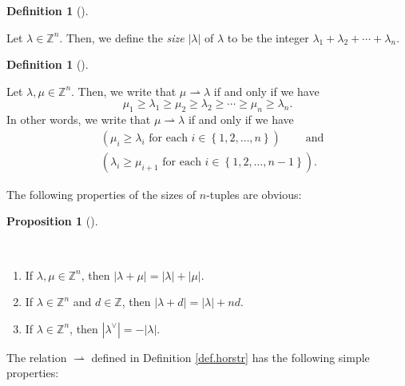 \documentclass[numbers=enddot,12pt,final,onecolumn,notitlepage]{scrartcl}%
\theoremstyle{definition}
\newtheorem{prop}[theo]{Proposition}
\newenvironment{proposition}[1][]
{\begin{prop}[#1]\begin{leftbar}}
{\end{leftbar}\end{prop}}
\newtheorem{defi}[theo]{Definition}
\newenvironment{definition}[1][]
{\begin{defi}[#1]\begin{leftbar}}
{\end{leftbar}\end{defi}}
\begin{document}
\begin{definition}
\label{def.size-snake}Let $\lambda\in\mathbb{Z}^{n}$. Then, we define the
\emph{size} $\left\vert \lambda\right\vert $ of $\lambda$ to be the integer
$\lambda_{1}+\lambda_{2}+\cdots+\lambda_{n}$.
\end{definition}

\begin{definition}
\label{def.horstr}Let $\lambda,\mu\in\mathbb{Z}^{n}$. Then, we write that
$\mu\rightharpoonup\lambda$ if and only if we have%
\begin{equation}
\mu_{1}\geq\lambda_{1}\geq\mu_{2}\geq\lambda_{2}\geq\cdots\geq\mu_{n}%
\geq\lambda_{n}. \label{eq.def.horstr.chain}%
\end{equation}
In other words, we write that $\mu\rightharpoonup\lambda$ if and only if we
have%
\begin{align*}
&  \left(  \mu_{i}\geq\lambda_{i}\text{ for each }i\in\left\{  1,2,\ldots
,n\right\}  \right)  \ \ \ \ \ \ \ \ \ \ \text{and}\\
&  \left(  \lambda_{i}\geq\mu_{i+1}\text{ for each }i\in\left\{
1,2,\ldots,n-1\right\}  \right)  .
\end{align*}

\end{definition}

The following properties of the sizes of $n$-tuples are obvious:

\begin{proposition}
\label{prop.size-snake.easies}\ \ 

\begin{enumerate}
\item[\textbf{(a)}] If $\lambda,\mu\in\mathbb{Z}^{n}$, then $\left\vert
\lambda+\mu\right\vert =\left\vert \lambda\right\vert +\left\vert
\mu\right\vert $.

\item[\textbf{(b)}] If $\lambda\in\mathbb{Z}^{n}$ and $d\in\mathbb{Z}$, then
$\left\vert \lambda+d\right\vert =\left\vert \lambda\right\vert +nd$.

\item[\textbf{(c)}] If $\lambda\in\mathbb{Z}^{n}$, then $\left\vert
\lambda^{\vee}\right\vert =-\left\vert \lambda\right\vert $.
\end{enumerate}
\end{proposition}

The relation $\rightharpoonup$ defined in Definition \ref{def.horstr} has the
following simple properties:
\end{document}

